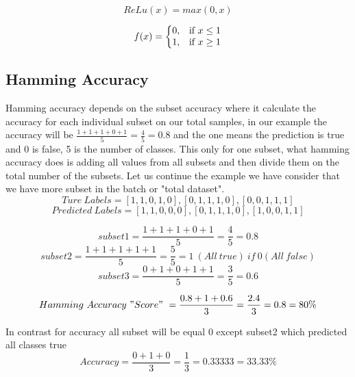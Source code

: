 \documentclass{article}
\begin{document}

    \begin{equation}\label{eq:relu}
        ReLu(x)= max(0,x)
    \end{equation}
    
    \begin{equation}\label{eq:derelu}
    f(x)=\left\{
    \begin{array}{@{}ll@{}}
    0, & \text{if}\ x \leq 1 \\
    1, & \text{if}\ x \geq 1
    \end{array}\right.
    \end{equation} 

\newpage  
\subsection{Hamming Accuracy}
Hamming accuracy depends on the subset accuracy where it calculate the accuracy for each individual subset on our total samples,  in our example the accuracy will be $\frac{1+1+1+0+1}{5} = \frac{4}{5} = 0.8$ and the one means the prediction is true and 0 is false, 5 is the number of classes. This only for one subset, what hamming accuracy does is adding all values from all subsets and then divide them on the total number of the subsets. Let us continue the example we have consider that we have more subset in the batch or "total dataset". 
$$Ture\ Labels = [1, 1, 0, 1, 0], 
               [0, 1, 1, 1, 0], 
               [0, 0, 1, 1, 1]
                $$
$$Predicted\ Labels = [1, 1, 0, 0, 0], 
               [0, 1, 1, 1, 0], 
               [1, 0, 0, 1, 1] $$

$$subset1 = \frac{1+1+1+0+1}{5} = \frac{4}{5} = 0.8$$
$$subset2 = \frac{1+1+1+1+1}{5} = \frac{5}{5} = 1 \ (All\ true) \ if \ 0(All\ false) $$
$$subset3 = \frac{0+1+0+1+1}{5} = \frac{3}{5} = 0.6$$

$$ Hamming \ Accuracy \ "Score" \ = \frac{0.8 + 1 + 0.6}{3} = \frac{2.4}{3} = 0.8 = 80 \% $$

In contrast for accuracy all subset will be equal 0 except subset2 which predicted all classes true $$ Accuracy = \frac{0 + 1 + 0}{3} = \frac{1}{3} = 0.33333 = 33.33 \% $$

    
    
\end{document}
